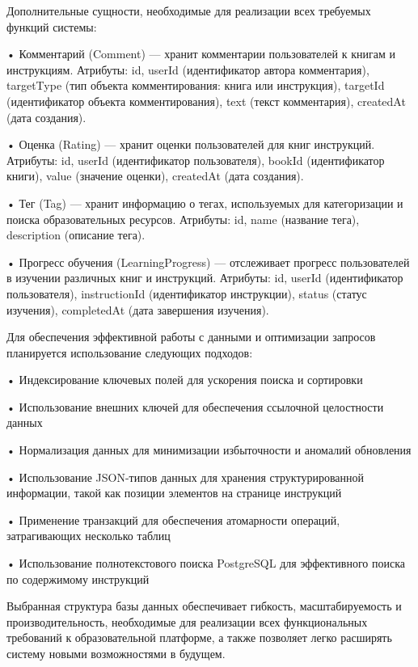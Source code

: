 {  \par \redline Дополнительные сущности, необходимые для реализации всех требуемых функций системы:

  \par \redline • Комментарий (Comment) — хранит комментарии пользователей к книгам и инструкциям. Атрибуты: id, userId (идентификатор автора комментария), targetType (тип объекта комментирования: книга или инструкция), targetId (идентификатор объекта комментирования), text (текст комментария), createdAt (дата создания).
  
  \par \redline • Оценка (Rating) — хранит оценки пользователей для книг инструкций. Атрибуты: id, userId (идентификатор пользователя), bookId (идентификатор книги), value (значение оценки), createdAt (дата создания).
  
  \par \redline • Тег (Tag) — хранит информацию о тегах, используемых для категоризации и поиска образовательных ресурсов. Атрибуты: id, name (название тега), description (описание тега).
  
  \par \redline • Прогресс обучения (LearningProgress) — отслеживает прогресс пользователей в изучении различных книг и инструкций. Атрибуты: id, userId (идентификатор пользователя), instructionId (идентификатор инструкции), status (статус изучения), completedAt (дата завершения изучения).

  \par \redline Для обеспечения эффективной работы с данными и оптимизации запросов планируется использование следующих подходов:

  \par \redline • Индексирование ключевых полей для ускорения поиска и сортировки
  \par \redline • Использование внешних ключей для обеспечения ссылочной целостности данных
  \par \redline • Нормализация данных для минимизации избыточности и аномалий обновления
  \par \redline • Использование JSON-типов данных для хранения структурированной информации, такой как позиции элементов на странице инструкций
  \par \redline • Применение транзакций для обеспечения атомарности операций, затрагивающих несколько таблиц
  \par \redline • Использование полнотекстового поиска PostgreSQL для эффективного поиска по содержимому инструкций

  \par \redline Выбранная структура базы данных обеспечивает гибкость, масштабируемость и производительность, необходимые для реализации всех функциональных требований к образовательной платформе, а также позволяет легко расширять систему новыми возможностями в будущем.

  \par
}

